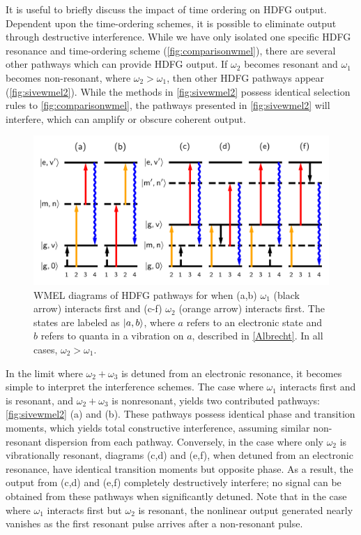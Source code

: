 \documentclass[aip, jcp, reprint, onecolumn, nofootinbib]{revtex4-2}
\begin{document}
It is useful to briefly discuss the impact of time ordering on HDFG output.
Dependent upon the time-ordering schemes, it is possible to eliminate output through destructive interference.\cite{RN287}
While we have only isolated one specific HDFG resonance and time-ordering scheme (\autoref{fig:comparisonwmel}), there are several other pathways which can provide HDFG output. \cite{RN352}
If $\omega_2$ becomes resonant and $\omega_1$ becomes non-resonant, where $\omega_2 > \omega_1$, then other HDFG pathways appear (\autoref{fig:sivewmel2}).\cite{McDonnell2024} 
While the methods in \autoref{fig:sivewmel2} possess identical selection rules to \autoref{fig:comparisonwmel}, the pathways presented in \autoref{fig:sivewmel2} will interfere, which can amplify or obscure coherent output.
\begin{figure}[!htbp]
	\centering
	\includegraphics[width=6.66 in]{figures/timeorderedwmel.png}
	\caption{WMEL diagrams of HDFG pathways for when (a,b) $\omega_1$ (black arrow) interacts first and (c-f) $\omega_2$ (orange arrow) interacts first. 
		The states are labeled as $\ket{a,b}$, where $a$ refers to an electronic state and $b$ refers to quanta in a vibration on $a$, described in \autoref{Albrecht}.
		In all cases, $\omega_2 > \omega_1$.
	}
	\label{fig:sivewmel2}
\end{figure}

In the limit where $\omega_2+\omega_3$ is detuned from an electronic resonance, it becomes simple to interpret the interference schemes. 
The case where $\omega_1$ interacts first and is resonant, and $\omega_2 + \omega_3$ is nonresonant, yields two contributed pathways: \autoref{fig:sivewmel2} (a) and (b).
These pathways possess identical phase and transition moments, which yields total constructive interference, assuming similar non-resonant dispersion from each pathway.
Conversely, in the case where only $\omega_2$ is vibrationally resonant, diagrams (c,d) and (e,f), when detuned from an electronic resonance, have identical transition moments but opposite phase. 
As a result, the output from (c,d) and (e,f) completely destructively interfere; no signal can be obtained from these pathways when significantly detuned. \cite{RN287, McDonnell2024}
Note that in the case where $\omega_1$ interacts first but $\omega_2$ is resonant, the nonlinear output generated nearly vanishes as the first resonant pulse arrives after a non-resonant pulse.
\end{document}
